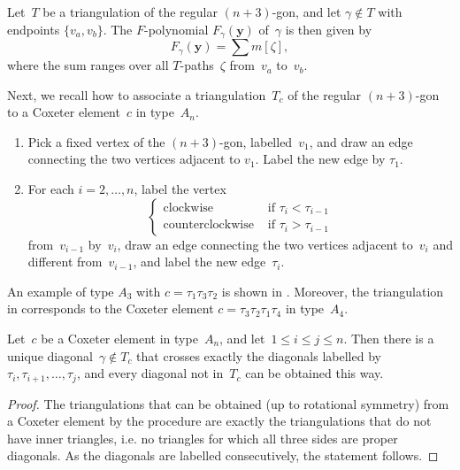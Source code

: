 \documentclass[ALCO,Unicode,ThmDefs]{cedram}
\newcommand{\y}{\mathbf{y}}
\begin{document}
\begin{theo}[{\cite[Theorem~5.1]{MS2010}}]\label{thm:schiffler}
Let~$T$ be a triangulation of the regular $(n+3)$-gon, and let $\gamma \notin T$ with endpoints $\{v_a,v_b\}$. The $F$-polynomial $F_\gamma(\y)$ of~$\gamma$ is then given by
\[
F_\gamma(\y) = \sum m[\zeta],
\]
where the sum ranges over all $T$-paths~$\zeta$ from~$v_a$ to~$v_b$.
\end{theo}

Next, we recall how to associate a triangulation~$T_c$ of the regular $(n+3)$-gon to a Coxeter element~$c$ in type~$A_n$.
\begin{enumerate}
\item Pick a fixed vertex of the $(n+3)$-gon, labelled~$v_1$, and draw an edge connecting the two vertices adjacent to $v_1$. Label the new edge by $\tau_1$.
\item For each $i = 2,\dots,n$, label the vertex
\[
\begin{cases}
\text{clockwise} & \text{ if } \tau_i < \tau_{i-1} \\
\text{counterclockwise} & \text{ if } \tau_i > \tau_{i-1}
\end{cases}
\]
from~$v_{i-1}$ by~$v_i$, draw an edge connecting the two vertices adjacent to~$v_i$ and different from~$v_{i-1}$, and label the new edge~$\tau_i$.
\end{enumerate}

An example of type $A_3$ with $c = \tau_1\tau_3\tau_2$ is shown in . Moreover, the triangulation in  corresponds to the Coxeter element $c = \tau_3\tau_2\tau_1\tau_4$ in type~$A_4$.

\begin{lemm}\label{lem:diagonalspositiveroots}
Let~$c$ be a Coxeter element in type~$A_n$, and let~$1 \leq i \leq j \leq n$. Then there is a unique diagonal~$\gamma \notin T_c$ that crosses exactly the diagonals labelled by $\tau_i,\tau_{i+1},\dots,\tau_j$, and every diagonal not in~$T_c$ can be obtained this way.
\end{lemm}

\begin{proof}
The triangulations that can be obtained (up to rotational symmetry) from a Coxeter element by the procedure are exactly the triangulations that do not have inner triangles, i.e. no triangles for which all three sides are proper diagonals. As the diagonals are labelled consecutively, the statement follows.
\end{proof}
\end{document}
